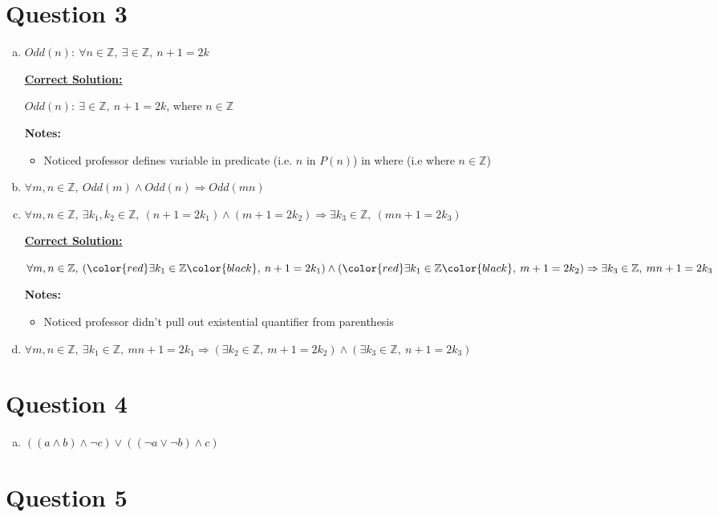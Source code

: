 \documentclass[12pt]{article}
\begin{document}
\section*{Question 3}
\begin{enumerate}[a.]
    \item $Odd(n):\:\forall n \in \mathbb{Z},\:\exists \in \mathbb{Z},\:n+1=2k$

    \bigskip

    \begin{mdframed}
        \underline{\textbf{Correct Solution:}}

        \bigskip

        $Odd(n):\:\exists \in \mathbb{Z},\:n+1=2k$, \color{red}where $n \in \mathbb{Z}$\color{black}
    \end{mdframed}

    \bigskip

    \textbf{Notes:}

    \begin{itemize}
        \item Noticed professor defines variable in predicate (i.e. $n$ in $P(n)$)
    in where (i.e where $n \in \mathbb{Z}$)
    \end{itemize}

    \item $\forall m,n \in \mathbb{Z},\:Odd(m) \land Odd(n) \Rightarrow Odd(mn)$
    \item $\forall m,n \in \mathbb{Z},\:\exists k_1,k_2 \in \mathbb{Z},\:(n+1=2k_1)
    \land (m+1=2k_2) \Rightarrow \exists k_3 \in \mathbb{Z},\:(mn+1=2k_3)$

    \bigskip

    \begin{mdframed}
        \underline{\textbf{Correct Solution:}}

        \bigskip

        $\forall m,n \in \mathbb{Z},\:(\color{red}\exists k_1 \in \mathbb{Z}\color{black},\:n+1=2k_1) \land
        (\color{red}\exists k_1 \in \mathbb{Z}\color{black},\:m+1=2k_2) \Rightarrow \exists k_3 \in \mathbb{Z},\:mn+1=2k_3$
    \end{mdframed}

    \bigskip

    \textbf{Notes:}

    \begin{itemize}
        \item Noticed professor didn't pull out existential quantifier from parenthesis
    \end{itemize}

    \item $\forall m,n \in \mathbb{Z},\:\exists k_1 \in \mathbb{Z},\: mn + 1 = 2k_1
    \Rightarrow (\exists k_2 \in \mathbb{Z},\:m+1 = 2k_2) \land (\exists k_3 \in \mathbb{Z},\:
    n + 1 = 2k_3)$
\end{enumerate}

\section*{Question 4}
\begin{enumerate}[a.]
    \item $((a \land b) \land \neg c) \lor ((\neg a \lor \neg b) \land c)$
\end{enumerate}

\section*{Question 5}
\end{document}

